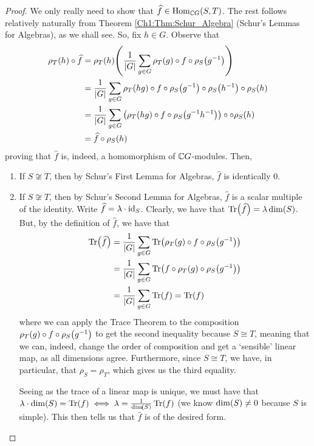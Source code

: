 \begin{proof}
    We only really need to show that $\widehat{f} \in \operatorname{Hom}_{\mathbb{C} G}(S, T)$. The rest follows relatively naturally from Theorem \ref{Ch1:Thm:Schur_Algebra} (Schur's Lemmas for Algebras), as we shall see. So, fix $h \in G$. Observe that
    \begin{align*}
        \rho_T(h) \circ \widehat{f} &= \rho_T(h)\!\left( \frac{1}{\left\lvert G \right\rvert} \sum_{g \in G} \rho_T(g) \circ f \circ \rho_S\!\left( g^{-1} \right) \right) \\
        &= \frac{1}{\left\lvert G \right\rvert} \sum_{g \in G} \rho_T(hg) \circ f \circ \rho_S\!\left( g^{-1} \right) \circ \rho_S\!\left( h^{-1} \right) \circ \rho_S(h) \\
        &= \frac{1}{\left\lvert G \right\rvert} \sum_{g \in G} \left( \rho_T(hg) \circ f \circ \rho_S\!\left( g^{-1} h^{-1} \right) \right) \circ \circ \rho_S(h) \\
        &= \widehat{f} \circ \rho_S(h)
    \end{align*}
    proving that $\hat{f}$ is, indeed, a homomorphism of $\mathbb{C} G$-modules. Then,
    \begin{enumerate}
        \item If $S \not\cong T$, then by Schur's First Lemma for Algebras, $\hat{f}$ is identically $0$.
        \item If $S \not\cong T$, then by Schur's Second Lemma for Algebras, $\hat{f}$ is a scalar multiple of the identity. Write $\widehat{f} = \lambda \cdot \operatorname{id}_S$. Clearly, we have that $\operatorname{Tr}\!\left( \widehat{f} \right) = \lambda \dim\!\left( S \right)$. But, by the definition of $\hat{f}$, we have that
        \begin{align*}
            \Tr{\hat{f}} &= \frac{1}{\abs{G}} \sum_{g \in G} \Tr{\rho_T(g) \circ f \circ \rho_S\!\parenth{g\inv}} \\
            &= \frac{1}{\abs{G}} \sum_{g \in G} \Tr{f \circ \rho_T\!\parenth{g} \circ \rho_S\!\parenth{g\inv}} \\
            &= \frac{1}{\abs{G}} \sum_{g \in G} \Tr{f} = \Tr{f}
        \end{align*}
        where we can apply the Trace Theorem to the composition $\rho_T(g) \circ f \circ \rho_S\!\left( g^{-1} \right)$ to get the second inequality because $S \cong T$, meaning that we can, indeed, change the order of composition and get a `sensible' linear map, as all dimensions agree. Furthermore, since $S \cong T$, we have, in particular, that $\rho_S = \rho_T$, which gives us the third equality.
        
        Seeing as the trace of a linear map is unique, we must have that $\lambda \cdot \dim\!\left( S \right) = \operatorname{Tr}\!\left( f \right) \iff \lambda = \frac{1}{\dim\!\left( S \right)} \operatorname{Tr}\!\left( f \right)$ (we know $\dim\!\left( S \right) \neq 0$ because $S$ is simple). This then tells us that $\hat{f}$ is of the desired form.
    \end{enumerate}
\end{proof}

